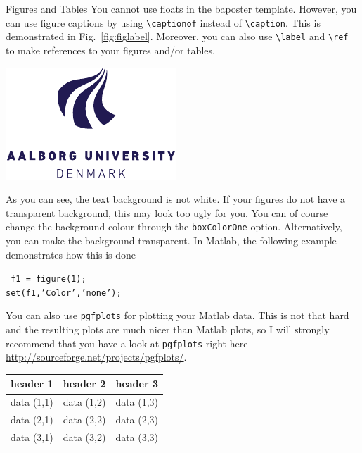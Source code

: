 \documentclass[a0paper,portrait]{baposter}
\begin{document}
\begin{poster}
\begin{posterbox}[name=figures,column=1,below=install,above=bottom]{Figures and Tables}
You cannot use floats in the baposter template. However, you can use figure captions by using {\tt \textbackslash captionof} instead of {\tt \textbackslash caption}. This is demonstrated in Fig.~\ref{fig:figlabel}. Moreover, you can also use {\tt \textbackslash label} and {\tt \textbackslash ref} to make references to your figures and/or tables.
\begin{center}
  \includegraphics{aau_logo_new}
  \label{fig:figlabel}
\end{center}
As you can see, the text background is not white. If your figures do not have a transparent background, this may look too ugly for you. You can of course change the background colour through the {\tt boxColorOne} option. Alternatively, you can make the background transparent. In Matlab, the following example demonstrates how this is done\par
{\tt
f1 = figure(1);\\
set(f1,'Color','none');
}\par
You can also use {\tt pgfplots} \cite{pgfplots} for plotting your Matlab data. This is not that hard and the resulting plots are much nicer than Matlab plots, so I will strongly recommend that you have a look at {\tt pgfplots} right here \url{http://sourceforge.net/projects/pgfplots/}.
\begin{center}
  \begin{tabular}{c c c}
    \toprule
    header 1 & header 2 & header 3\\
    \midrule
    data (1,1) & data (1,2) & data (1,3)\\
    data (2,1) & data (2,2) & data (2,3)\\
    data (3,1) & data (3,2) & data (3,3)\\
    \bottomrule
  \end{tabular}
  \label{tab:tablabel}
\end{center}
\end{posterbox}


\end{poster}
\end{document}
